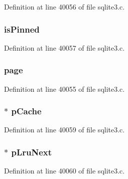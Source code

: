 Definition at line 40056 of file sqlite3.\+c.

\hypertarget{struct_pg_hdr1_a5b62b1cdb700ec6a30076588c35dd39d}{}
\subsubsection[{is\+Pinned}]{ is\+Pinned}\label{struct_pg_hdr1_a5b62b1cdb700ec6a30076588c35dd39d}


Definition at line 40057 of file sqlite3.\+c.

\hypertarget{struct_pg_hdr1_a6f0f11d1a7d4358de3be5a1a690ed6d6}{}
\subsubsection[{page}]{ page}\label{struct_pg_hdr1_a6f0f11d1a7d4358de3be5a1a690ed6d6}


Definition at line 40055 of file sqlite3.\+c.

\hypertarget{struct_pg_hdr1_a1daf71224c0c5b8e31d57a6db8d626fd}{}
\subsubsection[{p\+Cache}]{$\ast$ p\+Cache}\label{struct_pg_hdr1_a1daf71224c0c5b8e31d57a6db8d626fd}


Definition at line 40059 of file sqlite3.\+c.

\hypertarget{struct_pg_hdr1_ad9f6fb882c1329a87f97f54e70ebeb8a}{}
\subsubsection[{p\+Lru\+Next}]{$\ast$ p\+Lru\+Next}\label{struct_pg_hdr1_ad9f6fb882c1329a87f97f54e70ebeb8a}


Definition at line 40060 of file sqlite3.\+c.

\hypertarget{struct_pg_hdr1_ab5b315b564cf7865933552b7cb0ab73a}{}
